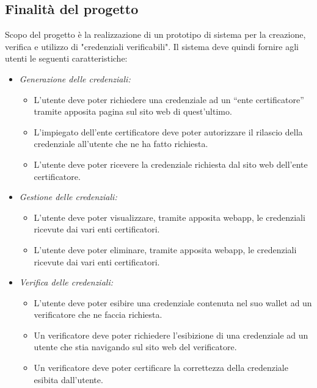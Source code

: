 \subsection{Finalità del progetto}
Scopo del progetto è la realizzazione di un prototipo di sistema per la creazione, verifica e utilizzo di "credenziali verificabili".\newline
Il sistema deve quindi fornire agli utenti le seguenti caratteristiche:
    \begin{itemize}
        \item \textit{Generazione delle credenziali:}
            \begin{itemize}
                \item L’utente deve poter richiedere una credenziale ad un “ente certificatore” tramite apposita pagina sul sito web di quest’ultimo.
                \item L’impiegato  dell’ente certificatore deve poter autorizzare il rilascio della credenziale all’utente che ne ha fatto richiesta.
                \item L’utente deve poter ricevere la credenziale richiesta dal sito web dell’ente certificatore.
            \end{itemize}
        \item \textit{Gestione delle credenziali:}
            \begin{itemize}
                \item L’utente deve poter visualizzare, tramite apposita webapp,  le credenziali ricevute dai vari enti certificatori.
                \item L’utente deve poter eliminare, tramite apposita webapp, le credenziali ricevute dai vari enti certificatori.
            \end{itemize}
        \item \textit{Verifica delle credenziali:}
            \begin{itemize}
                \item L’utente deve poter esibire una credenziale contenuta nel suo wallet ad un verificatore che ne faccia richiesta.
                \item Un verificatore deve poter richiedere l’esibizione di una credenziale ad un utente che stia navigando sul sito web del verificatore.
                \item Un verificatore deve poter certificare la correttezza della credenziale esibita dall'utente.
            \end{itemize}
    \end{itemize}

